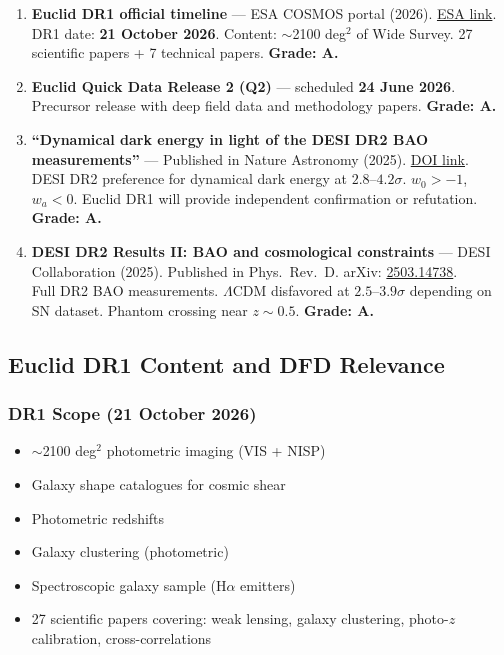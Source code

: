 \documentclass[11pt,a4paper]{article}
\begin{document}
\begin{enumerate}
\item \textbf{Euclid DR1 official timeline} --- ESA COSMOS portal (2026). \href{https://www.cosmos.esa.int/web/euclid/euclid-dr1}{ESA link}.\\
DR1 date: \textbf{21 October 2026}. Content: $\sim$2100 deg$^2$ of Wide Survey. 27 scientific papers + 7 technical papers. \textbf{Grade: A.}

\item \textbf{Euclid Quick Data Release 2 (Q2)} --- scheduled \textbf{24 June 2026}. Precursor release with deep field data and methodology papers. \textbf{Grade: A.}

\item \textbf{``Dynamical dark energy in light of the DESI DR2 BAO measurements''} --- Published in Nature Astronomy (2025). \href{https://www.nature.com/articles/s41550-025-02669-6}{DOI link}.\\
DESI DR2 preference for dynamical dark energy at $2.8$--$4.2\sigma$. $w_0 > -1$, $w_a < 0$. Euclid DR1 will provide independent confirmation or refutation. \textbf{Grade: A.}

\item \textbf{DESI DR2 Results II: BAO and cosmological constraints} --- DESI Collaboration (2025). Published in Phys.\ Rev.\ D. arXiv: \href{https://arxiv.org/abs/2503.14738}{2503.14738}.\\
Full DR2 BAO measurements. $\Lambda$CDM disfavored at $2.5$--$3.9\sigma$ depending on SN dataset. Phantom crossing near $z \sim 0.5$. \textbf{Grade: A.}
\end{enumerate}

\subsection{Euclid DR1 Content and DFD Relevance}

\subsubsection{DR1 Scope (21 October 2026)}
\begin{itemize}
\item $\sim$2100 deg$^2$ photometric imaging (VIS + NISP)
\item Galaxy shape catalogues for cosmic shear
\item Photometric redshifts
\item Galaxy clustering (photometric)
\item Spectroscopic galaxy sample (H$\alpha$ emitters)
\item 27 scientific papers covering: weak lensing, galaxy clustering, photo-$z$ calibration, cross-correlations
\end{itemize}
\end{document}
